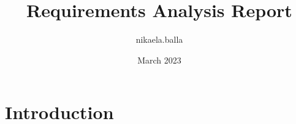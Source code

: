 \documentclass{article}
\title{Requirements Analysis Report}
\author{nikaela.balla }
\date{March 2023}
\begin{document}
\maketitle

\section{Introduction}
\end{document}
